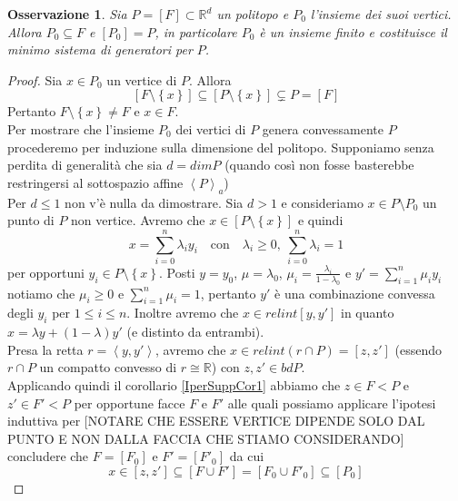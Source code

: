 \documentclass[a4paper,12pt,italian]{article}
\newcommand{\Rd}{\mathbb{R}^d}
\newtheorem{oss}{Osservazione}
\begin{document}
\begin{oss}
Sia $P=\left[F\right]\subset\Rd$ un politopo e $P_0$ l'insieme dei suoi vertici. Allora $P_0\subseteq F$ e $\left[P_0\right]=P$,
in particolare $P_0$ \`e un insieme finito e costituisce il minimo sistema di generatori per $P$.
\end{oss}
\begin{proof}
Sia $x\in P_0$ un vertice di $P$. Allora 
\begin{equation*}
\left[F\setminus\left\{x\right\}\right]\subseteq\left[P\setminus\left\{x\right\}\right]\subsetneq P=\left[F\right]
\end{equation*}
Pertanto $F\setminus\left\{x\right\}\neq F$ e $x\in F$.\\
Per mostrare che l'insieme $P_0$ dei vertici di $P$ genera convessamente $P$
procederemo per induzione sulla dimensione del politopo. Supponiamo senza perdita di generalit\`a che sia $d=dimP$ (quando cos\`i non fosse
basterebbe restringersi al sottospazio affine $\left<P\right>_a$)\\
Per $d\leq 1$ non v'\`e nulla da dimostrare. Sia $d>1$ e consideriamo $x\in P\setminus P_0$ un punto di $P$ non vertice. Avremo che
$x\in\left[P\setminus\left\{x\right\}\right]$ e quindi
\begin{equation*}
x=\sum_{i=0}^n \lambda_i y_i\quad\text{con}\quad\lambda_i\geq 0,\ \sum_{i=0}^n\lambda_i=1
\end{equation*}
per opportuni $y_i\in P\setminus\left\{x\right\}$. Posti $y=y_0$, $\mu=\lambda_0$, $\mu_i=\frac{\lambda_i}{1-\lambda_0}$ e
$y'=\sum_{i=1}^n\mu_i y_i$ notiamo che $\mu_i\geq 0$ e $\sum_{i=1}^n\mu_i=1$, pertanto $y'$ \`e una combinazione convessa
degli $y_i$ per $1\leq i\leq n$. Inoltre avremo che $x\in relint\left[y,y'\right]$ in quanto $x=\lambda y+(1-\lambda)y'$
(e distinto da entrambi).\\
Presa la retta $r=\left<y,y'\right>$, avremo che $x\in relint(r\cap P)=\left[z,z'\right]$ (essendo $r\cap P$ un compatto
convesso di $r\cong\mathbb{R}$) con $z,z'\in bd P$.\\
Applicando quindi il corollario \ref{IperSuppCor1} abbiamo che $z\in F<P$ e $z'\in F'<P$ per opportune facce $F$ e $F'$ alle quali possiamo
applicare l'ipotesi induttiva per [NOTARE CHE ESSERE VERTICE DIPENDE SOLO DAL PUNTO E NON DALLA FACCIA CHE STIAMO CONSIDERANDO] concludere
che $F=\left[F_0\right]$ e $F'=\left[F'_0\right]$ da cui
\begin{equation*}
x\in\left[z,z'\right]\subseteq\left[F\cup F'\right]=\left[F_0\cup F'_0\right]\subseteq\left[P_0\right]
\end{equation*}
\end{proof}
\end{document}
